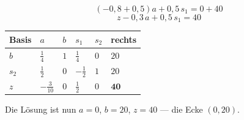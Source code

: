 \begin{merksatz}
\[ (-0{,}8 + 0{,}5)a + 0{,}5\,s_1 = 0 + 40 \]
\[ z - 0{,}3\,a + 0{,}5\,s_1 = 40 \]

\begin{center}
{\small
\renewcommand{\arraystretch}{1.5}
\begin{tabular}{@{}P{1.6cm}P{1.4cm}P{1.4cm}P{1.4cm}P{1.4cm}P{1.4cm}@{}}
\toprule
\textbf{Basis} & $a$ & $b$ & $s_1$ & $s_2$ & \textbf{rechts}\\
\midrule
$b$ & $\tfrac14$ & $1$ & $\tfrac14$ & $0$ & $20$\\
$s_2$ & $\tfrac12$ & $0$ & $-\tfrac12$ & $1$ & $20$\\
\midrule
$z$ & $-\tfrac{3}{10}$ & $0$ & $\tfrac12$ & $0$ & $\mathbf{40}$\\
\bottomrule
\end{tabular}}
\end{center}

Die Lösung ist nun $a=0$, $b=20$, $z=40$ --- die Ecke $(0,20)$.
\end{merksatz}

